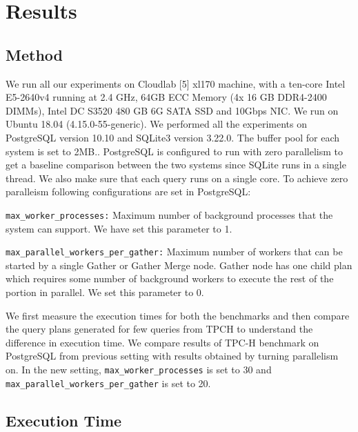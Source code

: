 \section{Results}
\label{sec:results}

\subsection{Method}
We run all our experiments on Cloudlab [5] xl170 machine, with a ten-core Intel E5-2640v4 running at 2.4 GHz, 64GB ECC Memory (4x 16 GB DDR4-2400 DIMMs), Intel DC S3520 480 GB 6G SATA SSD and 10Gbps NIC. We run on Ubuntu 18.04 (4.15.0-55-generic). We performed all the experiments on PostgreSQL version 10.10 and SQLite3 version 3.22.0. The buffer pool for each system is set to 2MB.. PostgreSQL is configured to run with zero parallelism to get a baseline comparison between the two systems since SQLite runs in a single thread. We also make sure that each query runs on a single core. To achieve zero paralleism following configurations are set in PostgreSQL:

\texttt{max\_worker\_processes:} Maximum number of background processes that the system can support.
We have set this parameter to 1.

\texttt{max\_parallel\_workers\_per\_gather:} Maximum number of workers that can be started by a single Gather or Gather Merge node. Gather node has one child plan which requires some number of background workers to execute the rest of the portion in parallel. We set this parameter to 0.

We first measure the execution times for both the benchmarks and then compare the query plans generated for few queries from TPCH to understand the difference in execution time.
We compare results of TPC-H benchmark on PostgreSQL from previous setting with results obtained by turning parallelism on. In the new setting, \texttt{max\_worker\_processes} is set to 30 and \texttt{max\_parallel\_workers\_per\_gather} is set to 20.

\subsection{Execution Time}
\label{sec:time}


